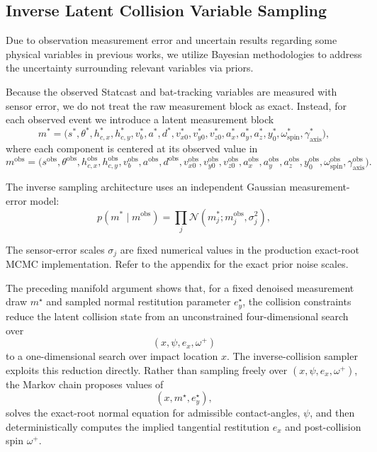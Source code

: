 \documentclass[11pt]{article}
\begin{document}
\subsection{Inverse Latent Collision Variable Sampling}

Due to observation measurement error and uncertain results regarding some physical variables in previous works, we utilize Bayesian methodologies to address the uncertainty surrounding relevant variables via priors.

Because the observed Statcast and bat-tracking variables are measured with sensor error, we do not treat the raw measurement block as exact. Instead, for each observed event we introduce a latent measurement block
\[
m^{\ast}
=
\Big(
s^{\ast},
\theta^{\ast},
h_{c,x}^{\ast},
h_{c,y}^{\ast},
v_b^{\ast},
a^{\ast},
d^{\ast},
v_{x0}^{\ast},
v_{y0}^{\ast},
v_{z0}^{\ast},
a_x^{\ast},
a_y^{\ast},
a_z^{\ast},
y_0^{\ast},
\omega_{\mathrm{spin}}^{\ast},
\gamma_{\mathrm{axis}}^{\ast}
\Big),
\]
where each component is centered at its observed value in
\[
m^{\mathrm{obs}}
=
\Big(
s^{\mathrm{obs}},
\theta^{\mathrm{obs}},
h_{c,x}^{\mathrm{obs}},
h_{c,y}^{\mathrm{obs}},
v_b^{\mathrm{obs}},
a^{\mathrm{obs}},
d^{\mathrm{obs}},
v_{x0}^{\mathrm{obs}},
v_{y0}^{\mathrm{obs}},
v_{z0}^{\mathrm{obs}},
a_x^{\mathrm{obs}},
a_y^{\mathrm{obs}},
a_z^{\mathrm{obs}},
y_0^{\mathrm{obs}},
\omega_{\mathrm{spin}}^{\mathrm{obs}},
\gamma_{\mathrm{axis}}^{\mathrm{obs}}
\Big).
\]

The inverse sampling architecture uses an independent Gaussian measurement-error model:
\[
p(m^{\ast}\mid m^{\mathrm{obs}})
=
\prod_{j}
\mathcal{N}
\left(
m_j^{\ast};
m_j^{\mathrm{obs}},
\sigma_j^2
\right),
\]

The sensor-error scales $\sigma_j$ are fixed numerical values in the production exact-root MCMC implementation. Refer to the appendix for the exact prior noise scales.

The preceding manifold argument shows that, for a fixed denoised measurement draw
$m^{\star}$ and sampled normal restitution parameter $e_y^{\star}$, the collision
constraints reduce the latent collision state from an unconstrained four-dimensional
search over
\[
(x,\psi,e_x,\omega^+)
\]
to a one-dimensional search over impact location $x$. The
inverse-collision sampler exploits this reduction directly. Rather than
sampling freely over $(x,\psi,e_x,\omega^+)$, the Markov chain proposes values of
\[
(x,m^{\star},e_y^{\star}),
\]
solves the exact-root normal equation for admissible contact-angles,
$\psi$, and then deterministically computes the implied tangential restitution
$e_x$ and post-collision spin $\omega^+$.
\end{document}
